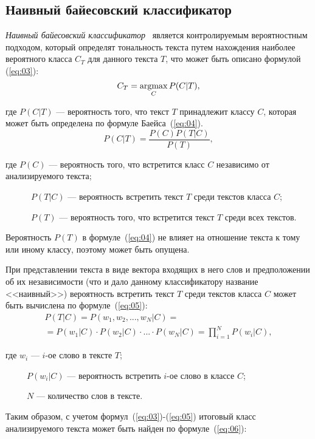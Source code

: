\subsection{Наивный байесовский классификатор}

\textit{Наивный байесовский классификатор}~\cite{article21} является
контролируемым вероятностным подходом, который определят тональность текста
путем нахождения наиболее вероятного класса $C_T$ для данного текста $T$, что
может быть описано формулой (\ref{eq:03}):
\begin{equation}\label{eq:03}
    C_T = \operatorname*{argmax}_C P(C|T),
\end{equation}

где $P(C|T)$ --- вероятность того, что текст $T$ принадлежит классу $C$,
которая может быть определена по формуле Баейса~(\ref{eq:04}).
\begin{equation}\label{eq:04}
    P(C|T) = \frac{P(C)P(T|C)}{P(T)},
\end{equation}

где $P(C)$ --- вероятность того, что встретится класс $C$ независимо от
анализируемого текста;

~~~~~~$P(T|C)$ --- вероятность встретить текст $T$ среди текстов класса $C$;

~~~~~~$P(T)$ --- вероятность того, что встретится текст $T$ среди всех текстов.

Вероятность $P(T)$ в формуле~(\ref{eq:04}) не влияет на отношение текста к тому
или иному классу, поэтому может быть опущена.

При представлении текста в виде вектора входящих в него слов и предположении об
их независимости (что и дало данному классификатору название <<наивный>>)
вероятность встретить текст $T$ среди текстов класса $C$ может быть вычислена по
формуле~(\ref{eq:05}):
\begin{multline}\label{eq:05}
    P(T|C) = P(w_1, w_2, ..., w_N|C) = \\ =P(w_1|C) \cdot P(w_2|C) \cdot ...
    \cdot P(w_N|C) = \prod\limits_{i=1}^{N} P(w_i|C),
\end{multline}

где $w_i$ --- $i$-ое слово в тексте $T$;

~~~~~$P(w_i|C)$ --- вероятность встретить $i$-ое слово в классе $C$;

~~~~~$N$ --- количество слов в тексте.

Таким образом, с учетом формул~(\ref{eq:03})-(\ref{eq:05}) итоговый класс
анализируемого текста может быть найден по формуле~(\ref{eq:06}):

